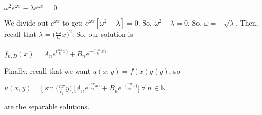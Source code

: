 \documentclass[executivepaper]{article}
\begin{document}
\begin{flushleft}
\begin{center}

$\omega^2 e^{\omega x}-\lambda e^{\omega x}=0$

\end{center}

We divide out $e^{\omega x}$ to get: $e^{\omega x} [\omega^2 - \lambda]=0$. So, $\omega^2-\lambda=0$. So, $\omega=\pm \sqrt{\lambda}$. Then, recall that $\lambda=\bigg(\frac{n \pi}{l_{2}} x\bigg)^2$. So, our solution is

\begin{center}

$f_{n, D}(x)=A_{n}e^{\Big(\frac{n \pi}{l_{2}} x\Big)} + B_{n} e^{-\Big(\frac{ni \pi}{l_{2}} x\Big)}$

\end{center}

Finally, recall that we want $u(x,y)=f(x)g(y)$, so

\begin{center}

$u(x,y)=\bigg[\sin\bigg(\frac{n \pi}{l_{2}} y\bigg)\bigg] \bigg[A_{n} e^{\Big(\frac{n \pi}{l_{2}} x \Big)} + B_{n} e^{-\Big(\frac{n \pi}{l_{2}} x\Big)}\bigg] ~ \forall ~ n \in \mathbb{N}$

\end{center}

are the separable solutions.

\end{flushleft}
\end{document}
